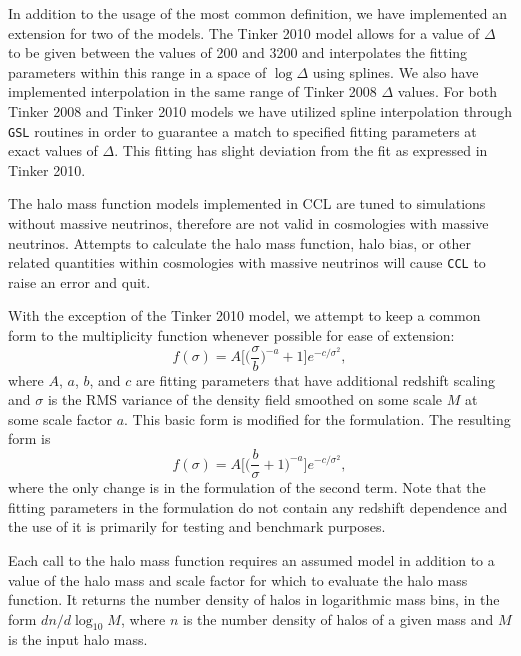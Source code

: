 \documentclass[\docopts]{\docclass}
\newcommand{\ccl}{{\tt CCL}\xspace}
\begin{document}
In addition to the usage of the most common definition, we have implemented an
extension for two of the models. The Tinker 2010 model allows for a value of
$\Delta$ to be given between the values of 200 and 3200 and interpolates the
fitting parameters within this range in a space of $\log \Delta$ using splines.
We also have implemented interpolation in the same range of Tinker 2008 $\Delta$
values. For both Tinker 2008 and Tinker 2010 models we have utilized spline
interpolation through {\tt GSL} routines in order to guarantee a match to
specified fitting parameters at exact values of $\Delta$. This fitting has
slight deviation from the fit as expressed in Tinker 2010.

The halo mass function models implemented in CCL are tuned to simulations
without massive neutrinos, therefore are not valid in cosmologies with massive
neutrinos. Attempts to calculate the halo mass function, halo bias, or other
related quantities within cosmologies with massive neutrinos will cause \ccl to
raise an error and quit.

With the exception of the Tinker 2010 model, we attempt to keep a common form
to the multiplicity function whenever possible for ease of extension:
\begin{equation}
f(\sigma)=A\Big[\Big(\frac{\sigma}{b}\Big)^{-a}+1\Big]e^{-c/{\sigma}^2},
\end{equation}
where $A$, $a$, $b$, and $c$ are fitting parameters that have additional
redshift scaling and $\sigma$ is the RMS variance of the density field smoothed
on some scale $M$ at some scale factor $a$. This basic form is modified for
the \citet{Angulo2012} formulation. The resulting form is
\begin{equation}
f(\sigma)=A\Big[\Big(\frac{b}{\sigma}+1\Big)^{-a}\Big]e^{-c/{\sigma}^2},
\end{equation}
where the only change is in the formulation of the second term. Note that the
fitting parameters in the \citet{Angulo2012} formulation do not contain any
redshift dependence and the use of it is primarily for testing and benchmark purposes.

Each call to the halo mass function requires an assumed model in addition to a
value of the halo mass and scale factor for which to evaluate the halo mass
function. It returns the number density of halos in logarithmic mass bins,
in the form $dn/d\log_{10}{M}$, where $n$ is the number density of halos of a
given mass and $M$ is the input halo mass.
\end{document}
